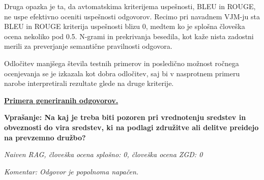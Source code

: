 \documentclass[a4paper,12pt,openright]{book}
\begin{document}
Druga opazka je ta, da avtomatskima kriterijema uspešnosti, BLEU in ROUGE, ne uspe efektivno oceniti uspešnosti odgovorov. Recimo pri navadnem VJM-ju sta BLEU in ROUGE kriterija uspešnosti blizu 0, medtem ko je splošna človeška ocena nekoliko pod 0.5. N-grami in prekrivanja besedila, kot kaže nista zadostni merili za preverjanje semantične pravilnosti odgovora.

Odločitev manjšega števila testnih primerov in posledično možnost ročnega ocenjevanja se je izkazala kot dobra odločitev, saj bi v nasprotnem primeru narobe interpretirali rezultate glede na druge kriterije.

\underline{\textbf{Primera generiranih odgovorov.}}

\textbf{Vprašanje: Na kaj je treba biti pozoren pri vrednotenju sredstev in obveznosti do vira sredstev, ki na podlagi združitve ali delitve preidejo na prevzemno družbo?}

\textit{Naiven RAG, človeška ocena splošno: 0, človeška ocena ZGD: 0}

\textit{Komentar: Odgovor je popolnoma napačen.}
\end{document}
